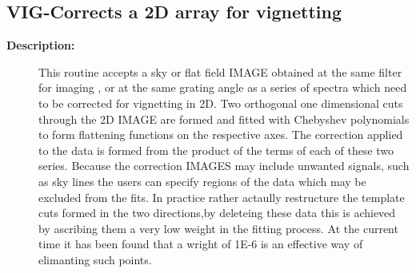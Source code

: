 \subsection{VIG-\label{VIG}Corrects a 2D array for vignetting}
\begin{description}

\item [{\bf Description:}]
   This routine accepts a sky or flat field IMAGE obtained at
   the same filter for imaging , or at the same grating angle as a
   series of spectra which need to be corrected for vignetting
   in 2D.
   Two orthogonal one dimensional cuts through the 2D
   IMAGE are formed and fitted with Chebyshev polynomials to form
   flattening functions on the respective axes. The correction
   applied to the data is formed from the product of the terms of
   each of these two series.
   Because the correction IMAGES may include unwanted signals, such as
   sky lines the users can specify regions of the data which may
   be excluded from the fits. In practice rather actaully restructure
   the template cuts formed in the two directions,by deleteing these
   data this is achieved by ascribing them a very low weight in
   the fitting process. At the current time it has been found that a
   wright of 1E-6 is an effective way of elimanting such points.


\end{description}
